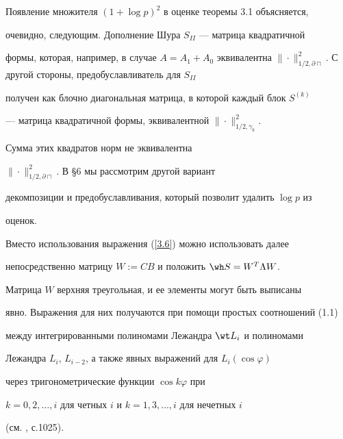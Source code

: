 \begin{notes}


Появление множителя $(1+\log p)^2$ в оценке теоремы 3.1 объясняется,


очевидно, следующим. Дополнение Шура $S_{II}$ --- матрица квадратичной


формы, которая, например, в случае $A=A_1+A_0$ эквивалентна $\|\cdot\|^2_


{1/2,\partial\sqcap}$. С другой стороны, предобуславливатель для $S_{II}$


получен как блочно диагональная матрица, в которой каждый блок $S^{(k)}$


--- матрица квадратичной формы, эквивалентной $\|\cdot\|^2_{1/2,\gamma_k}$.


Сумма этих квадратов норм не эквивалентна


$\|\cdot\|^2_{1/2,\partial\sqcap}$. В \S6 мы рассмотрим другой вариант


декомпозиции и предобуславливания, который позволит удалить $\log p$ из


оценок.


\end{notes}





\begin{notes}


Вместо использования выражения (\ref{3.6}) можно использовать далее


непосредственно матрицу $W:=CB$ и положить $\wh S=W^T\Lambda W$.


Матрица $W$ верхняя треугольная, и ее элементы могут быть выписаны


явно. Выражения для них получаются при помощи простых соотношений (1.1)


между интегрированными полиномами Лежандра $\wt L_i$ и полиномами


Лежандра $L_i$, $L_{i-2}$, а также явных выражений для $L_i(\cos\varphi)$


через тригонометрические функции $\cos k\varphi$ при


$k=0,2,\dotsc,i$ для четных $i$ и $k=1,3,\dotsc,i$ для нечетных $i$


(см. \cite{gra-ryz}, с.1025).


\end{notes}





